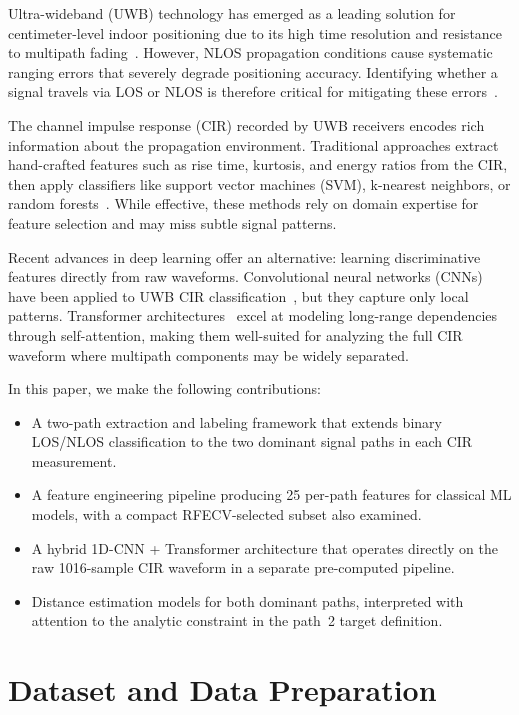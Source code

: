 \documentclass[conference]{IEEEtran}
\begin{document}
Ultra-wideband (UWB) technology has emerged as a leading solution for centimeter-level indoor positioning due to its high time resolution and resistance to multipath fading~\cite{b1}. However, NLOS propagation conditions cause systematic ranging errors that severely degrade positioning accuracy. Identifying whether a signal travels via LOS or NLOS is therefore critical for mitigating these errors~\cite{b2}.

The channel impulse response (CIR) recorded by UWB receivers encodes rich information about the propagation environment. Traditional approaches extract hand-crafted features such as rise time, kurtosis, and energy ratios from the CIR, then apply classifiers like support vector machines (SVM), k-nearest neighbors, or random forests~\cite{b3,b4}. While effective, these methods rely on domain expertise for feature selection and may miss subtle signal patterns.

Recent advances in deep learning offer an alternative: learning discriminative features directly from raw waveforms. Convolutional neural networks (CNNs) have been applied to UWB CIR classification~\cite{b5}, but they capture only local patterns. Transformer architectures~\cite{b6} excel at modeling long-range dependencies through self-attention, making them well-suited for analyzing the full CIR waveform where multipath components may be widely separated.

In this paper, we make the following contributions:
\begin{itemize}
    \item A two-path extraction and labeling framework that extends binary LOS/NLOS classification to the two dominant signal paths in each CIR measurement.
    \item A feature engineering pipeline producing 25 per-path features for classical ML models, with a compact RFECV-selected subset also examined.
    \item A hybrid 1D-CNN + Transformer architecture that operates directly on the raw 1016-sample CIR waveform in a separate pre-computed pipeline.
    \item Distance estimation models for both dominant paths, interpreted with attention to the analytic constraint in the path~2 target definition.
\end{itemize}

\section{Dataset and Data Preparation}
\end{document}
